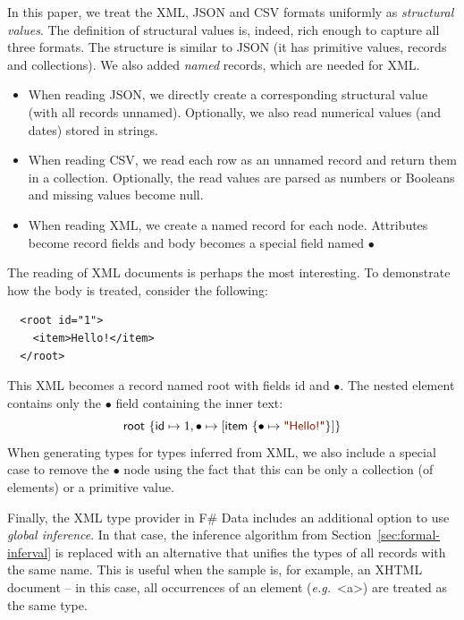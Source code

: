 \documentclass[10pt,preprint,blind,clearpagebib]{sigplanconf}
\newcommand{\kvd}[1]{\textnormal{\textcolor{kvdclr}{\sffamily #1}}}
\newcommand{\str}[1]{\textnormal{\textcolor{strclr}{\sffamily "#1"}}}
\newcommand{\ident}[1]{\textnormal{\sffamily #1}}
\begin{document}
In this paper, we treat the XML, JSON and CSV formats uniformly as \emph{structural values}.
The definition of structural values is, indeed, rich enough to capture all three formats. The
structure is similar to JSON (it has primitive values, records and collections). We also added
\emph{named} records, which are needed for XML.
%
\begin{itemize}
\item When reading JSON, we directly create a corresponding structural value (with all records unnamed).
  Optionally, we also read numerical values (and dates) stored in strings.
\item When reading CSV, we read each row as an unnamed record and return them in a collection.
  Optionally, the read values are parsed as numbers or Booleans and missing values become \kvd{null}.
\item When reading XML, we create a named record for each node. Attributes become record fields and
  body becomes a special field named $\bullet$
\end{itemize}
%
The reading of XML documents is perhaps the most interesting. To demonstrate how the body is treated,
consider the following:
%
{\small{
\begin{verbatim}
  <root id="1">
    <item>Hello!</item>
  </root>    
\end{verbatim}
}}
%
\noindent
This XML becomes a record named \ident{root} with fields \ident{id} and $\bullet$. The nested element
contains only the $\bullet$ field containing the inner text:
%
\begin{equation*}
\ident{root}~\{ \ident{id} \mapsto 1, \bullet \mapsto [ \ident{item}~\{ \bullet \mapsto \str{Hello!} \}] \}
\end{equation*}
%
When generating types for types inferred from XML, we also include a special case to remove the $\bullet$
node using the fact that this can be only a collection (of elements) or a primitive value.

Finally, the XML type provider in F\# Data includes an additional option to use \emph{global inference}.
In that case, the inference algorithm from Section~\ref{sec:formal-inferval} is replaced with an alternative
that unifies the types of all records with the same name. This is useful when the sample is, for example,
an XHTML document -- in this case, all occurrences of an element (\emph{e.g.}~{\small\ttfamily <a>})
are treated as the same type.


%
%
\end{document}
